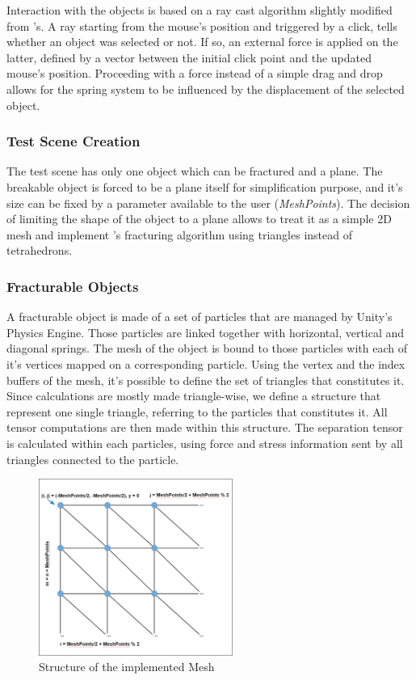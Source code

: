 \documentclass[tog]{acmsiggraph}
\begin{document}
Interaction with the objects is based on a ray cast algorithm slightly modified from \cite{Drag}'s. A ray starting from the mouse's position and triggered by a click, tells whether an object was selected or not. If so, an external force is applied on the latter, defined by a vector between the initial click point and the updated mouse's position. Proceeding with a force instead of a simple drag and drop allows for the spring system to be influenced by the displacement of the selected object. 

\subsubsection{Test Scene Creation}
The test scene has only one object which can be fractured and a plane. The breakable object is forced to be a plane itself for simplification purpose, and it's size can be fixed by a parameter available to the user (\textit{MeshPoints}). The decision of limiting the shape of the object to a plane allows to treat it as a simple 2D mesh and implement \cite{Obrien:1999:GMA}'s fracturing algorithm using triangles instead of tetrahedrons. 

\subsubsection{Fracturable Objects}
A fracturable object is made of a set of particles that are managed by Unity's Physics Engine. Those particles are linked together with horizontal, vertical and diagonal springs. The mesh of the object is bound to those particles with each of it's vertices mapped on a corresponding particle. Using the vertex and the index buffers of the mesh, it's possible to define the set of triangles that constitutes it. Since calculations are mostly made triangle-wise, we define a structure that represent one single triangle, referring to the particles that constitutes it. All tensor computations are then made within this structure. The separation tensor is calculated within each particles, using force and stress information sent by all triangles connected to the particle. 

\begin{figure}[ht]
  \centering
  \includegraphics[width=2.5in]{images/MeshDescription}
  \caption{Structure of the implemented Mesh}
  \label{fig:meshdescription}
\end{figure}
\end{document}

